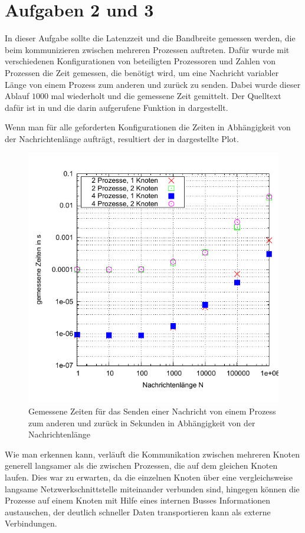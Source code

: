 \section*{Aufgaben 2 und 3}
In dieser Aufgabe sollte die Latenzzeit und die Bandbreite gemessen werden, die
beim kommunizieren zwischen mehreren Prozessen auftreten. Dafür wurde mit verschiedenen
Konfigurationen von beteiligten Prozessoren und Zahlen von Prozessen die Zeit gemessen,
die benötigt wird, um eine Nachricht variabler Länge von einem Prozess zum anderen
und zurück zu senden. Dabei wurde dieser Ablauf $1000$ mal wiederholt und die 
gemessene Zeit gemittelt. Der Quelltext dafür ist in  und die darin
aufgerufene Funktion in  dargestellt.




Wenn man für alle geforderten Konfigurationen die Zeiten in Abhängigkeit von der
Nachrichtenlänge aufträgt, resultiert der in  dargestellte Plot.

\begin{figure}[htb]
  \centering
  \includegraphics[width=0.8\columnwidth,keepaspectratio]{../tmp/zeiten}
  \caption{Gemessene Zeiten für das Senden einer Nachricht von einem Prozess zum
  anderen und zurück in Sekunden in Abhängigkeit von der Nachrichtenlänge}
  \label{fig:zeiten}
\end{figure}

Wie man erkennen kann, verläuft die Kommunikation zwischen mehreren Knoten generell
langsamer als die zwischen Prozessen, die auf dem gleichen Knoten laufen. Dies war 
zu erwarten, da die einzelnen Knoten über eine vergleichsweise langsame Netzwerkschnittstelle
miteinander verbunden sind, hingegen können die Prozesse auf einem Knoten mit Hilfe
eines internen Busses Informationen austauschen, der deutlich schneller Daten
transportieren kann als externe Verbindungen.

